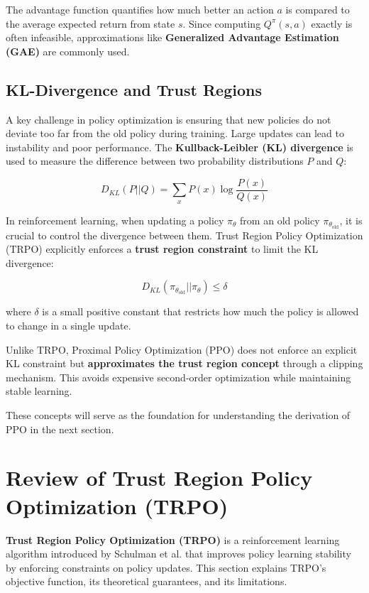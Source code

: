\documentclass[12pt]{extreport} %
\begin{document}
The advantage function quantifies how much better an action \( a \) is compared to the average expected return from state \( s \). Since computing \( Q^\pi(s, a) \) exactly is often infeasible, approximations like \textbf{Generalized Advantage Estimation (GAE)} \cite{schulman2015high} are commonly used.

\subsection{KL-Divergence and Trust Regions}

A key challenge in policy optimization is ensuring that new policies do not deviate too far from the old policy during training. Large updates can lead to instability and poor performance. The \textbf{Kullback-Leibler (KL) divergence} is used to measure the difference between two probability distributions \( P \) and \( Q \):

\begin{equation}
D_{KL}(P || Q) = \sum_x P(x) \log \frac{P(x)}{Q(x)}
\end{equation}

In reinforcement learning, when updating a policy \( \pi_\theta \) from an old policy \( \pi_{\theta_{\text{old}}} \), it is crucial to control the divergence between them. Trust Region Policy Optimization (TRPO) explicitly enforces a \textbf{trust region constraint} to limit the KL divergence:

\begin{equation}
D_{KL}(\pi_{\theta_{\text{old}}} || \pi_{\theta}) \leq \delta
\end{equation}

where \( \delta \) is a small positive constant that restricts how much the policy is allowed to change in a single update.

Unlike TRPO, Proximal Policy Optimization (PPO) does not enforce an explicit KL constraint but \textbf{approximates the trust region concept} through a clipping mechanism. This avoids expensive second-order optimization while maintaining stable learning.

These concepts will serve as the foundation for understanding the derivation of PPO in the next section.

\section{Review of \textbf{Trust Region Policy Optimization (TRPO)}}

\textbf{Trust Region Policy Optimization (TRPO)} is a reinforcement learning algorithm introduced by Schulman et al. \cite{schulman2015trust} that improves policy learning stability by enforcing constraints on policy updates. This section explains TRPO's objective function, its theoretical guarantees, and its limitations.
\end{document}
